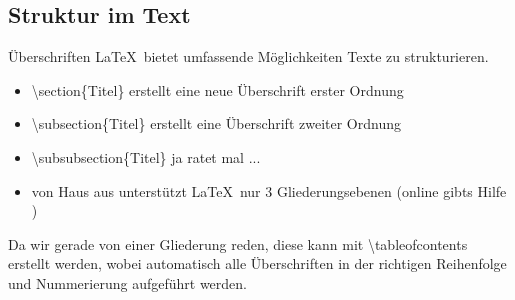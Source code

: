 \subsection{Struktur im Text}\label{sec:toc}
\begin{frame}{\"Uberschriften}
    \LaTeX~bietet umfassende M\"oglichkeiten Texte zu strukturieren. 
    \begin{itemize}
        \item \color{cturkis}\textbackslash section\color{black}\{Titel\} erstellt eine neue \"Uberschrift erster Ordnung 
        \item \color{cturkis}\textbackslash subsection\color{black}\{Titel\} erstellt eine \"Uberschrift zweiter Ordnung
        \item \color{cturkis}\textbackslash subsubsection\color{black}\{Titel\} ja ratet mal ...
        \item von Haus aus unterst\"utzt \LaTeX~nur 3 Gliederungsebenen (online gibts Hilfe \smiley)
    \end{itemize}
    Da wir gerade von einer Gliederung reden, diese kann mit \color{cturkis}\textbackslash tableofcontents \color{black}erstellt werden, wobei automatisch alle \"Uberschriften in der richtigen Reihenfolge und Nummerierung aufgef\"uhrt werden.
\end{frame}
